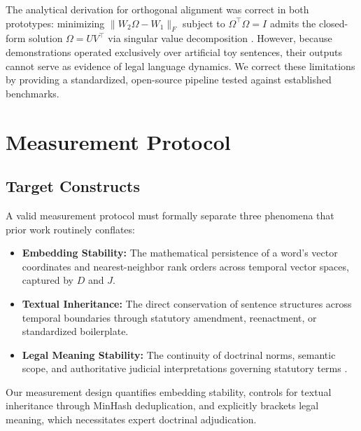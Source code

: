 \documentclass[conference]{IEEEtran}
\begin{document}
The analytical derivation for orthogonal alignment was correct in both prototypes: minimizing $\|W_2\Omega - W_1\|_F$ subject to $\Omega^\top\Omega = I$ admits the closed-form solution $\Omega = UV^\top$ via singular value decomposition \cite{schonemann1966generalized}. However, because demonstrations operated exclusively over artificial toy sentences, their outputs cannot serve as evidence of legal language dynamics. We correct these limitations by providing a standardized, open-source pipeline tested against established benchmarks.

\section{Measurement Protocol}
\subsection{Target Constructs}
\label{sec:constructs}
A valid measurement protocol must formally separate three phenomena that prior work routinely conflates:
\begin{itemize}
    \item \textbf{Embedding Stability:} The mathematical persistence of a word's vector coordinates and nearest-neighbor rank orders across temporal vector spaces, captured by $D$ and $J$.
    \item \textbf{Textual Inheritance:} The direct conservation of sentence structures across temporal boundaries through statutory amendment, reenactment, or standardized boilerplate.
    \item \textbf{Legal Meaning Stability:} The continuity of doctrinal norms, semantic scope, and authoritative judicial interpretations governing statutory terms \cite{hart1961concept, eskridge1987dynamic}.
\end{itemize}
Our measurement design quantifies embedding stability, controls for textual inheritance through MinHash deduplication, and explicitly brackets legal meaning, which necessitates expert doctrinal adjudication.
\end{document}
